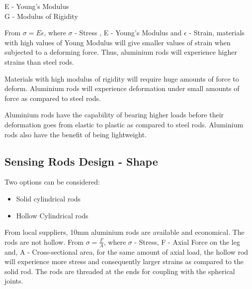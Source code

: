E - Young's Modulus\\
G - Modulus of Rigidity

From $ \sigma = E \epsilon $, where $\sigma$ - Stress , E - Young's Modulus and $ \epsilon$ - Strain, materials with high values of Young Modulus will give smaller values of strain when subjected to a deforming force. Thus, aluminium rods will experience higher strains than steel rods.

Materials with high modulus of rigidity will require huge amounts of force to deform. Aluminium rods will experience deformation under small amounts of force as compared to steel rods.

Aluminium rods have the capability of bearing higher loads before their deformation goes from elastic to plastic as compared to steel rods. Aluminium rods also have the benefit of being lightweight.



\subsection{Sensing Rods Design - Shape}
Two options can be considered:
\begin{itemize}
\item Solid cylindrical rods
\item Hollow Cylindrical rods
\end{itemize}
From local suppliers, 10mm aluminium rods are available and economical. The rods are not hollow. From $\sigma = \frac{F}{A}$, where $\sigma$ - Stress, F - Axial Force on the leg and, A - Cross-sectional area, for the same amount of axial load, the hollow rod will experience more stress and consequently larger strains as compared to the solid rod. The rods are threaded at the ends for coupling with the spherical joints.

